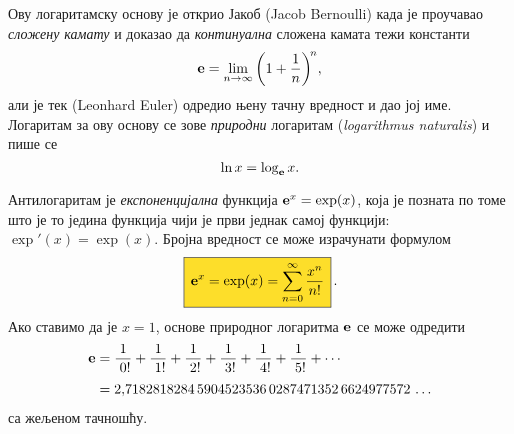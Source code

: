 Ову логаритамску основу је открио Јакоб  (Jacob Bernoulli) када је
проучавао {\sl сложену камату\/} и доказао да {\sl континуална\/} сложена камата
тежи константи
\begin{equation}\label{eq:elim}
\e=\lim_{n\to\infty}\left(1+\frac1n\right)^{\!n}\!,\index{лимес}
\end{equation}
али је тек  (Leonhard Euler)
одредио њену тачну вредност и дао јој име.
Логаритам за ову основу се зове
{\sl природни\/} логаритам ({\sl logarithmus naturalis\/})
и пише се
$$
\ln x=\log_{\bf e} x.
$$

\def\ep{\hphantom{!}}
\def\rf#1!{\frac1{\hphantom{!}#1!}}
Антилогаритам је {\sl експоненцијална\/} функција ${\bf e}^x=\exp(x)$, 
која је позната по томе што је то
једина функција чији је први
 једнак самој функцији: $\exp'(x)=\exp(x)$. 
Бројна вредност се може израчунати формулом
\begin{equation}
\label{eq:exp}\index{формула}
\okvir{\e^x=\exp(x)=\sum_{n=0}^\infty\frac{x^n}{n!}}.
\end{equation}%
Ако ставимо да је $x=1$,
 основе природног логаритма ${\bf e}$ се може одредити
\begin{equation}\label{eq:e}
\begin{split}
\e
&=\rf0!+\rf1!+\rf2!+\rf3!+\rf4!+\rf5!+\cdots\\
\noalign{\smallskip}
&=2\.
7182818284\,
5904523536\,
0287471352\,
6624977572\,\ldots
\end{split}
\end{equation}
са жељеном тачношћу.
